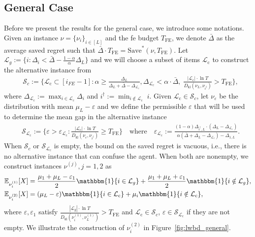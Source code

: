 \documentclass[twoside,11pt]{article}
\newcommand{\kl}{D_{\mathrm{kl}}}
\newcommand{\calL}{\mathcal{L}}
\newcommand{\calS}{\mathcal{S}}
\newcommand{\rmc}{\mathrm{c}}
\newcommand{\bbE}{\mathbb{E}}
\newcommand{\Tfe}{T_{\mathrm{FE}}}
\newcommand{\Saved}{\mathrm{Save}}
\newcommand{\idagger}{{i^{\dagger}}}
\newcommand{\barDelta}{\bar{\Delta}}
\begin{document}
\subsection{General Case}\label{app:general_result}
Before we present the results for the general case, we introduce some notations. 
Given an instance  $\nu = \{\nu_i\}_{i\in[L]}$ and the \ac{fe} budget $\Tfe$, we denote $\barDelta$ as the average saved regret such that $\barDelta\cdot \Tfe = \Saved^*(\nu,\Tfe) $.
Let $\calL_g := \{i:\Delta_i<\barDelta-\frac{1-\alpha}{\alpha}\Delta_L\}$ and we will choose a subset of items $\calL_{\rmc}$ to construct the alternative instance from
\begin{align}
    &\calS_c:=\Big\{
        \calL_{\rmc}\subset  [i_{FE}-1]: \alpha \geq \frac{\Delta_{L}}{\Delta_{L}+\barDelta-\Delta_{\calL_{\rmc}}},
            \Delta_{\calL_{\rmc}}<\alpha\cdot\barDelta,\;
            \frac{|\calL_{\rmc}|\cdot \ln T}{\kl(\nu_L,\nu_{i^\dagger})} > \Tfe
    \Big\},
\end{align}
where $\Delta_{\calL_{\rmc}}:=\max_{i\in\calL_{\rmc}}\Delta_{i}$ and 
    $\idagger:=\min_{i\notin\calL_{\rmc}}\; i$.
Given $\calL_{\rmc}\in\calS_c$, let $\nu_\varepsilon$ be the distribution with mean $\mu_L-\varepsilon$ and we define the permissible $\varepsilon$ that will be used to determine the mean gap in the alternative instance
\begin{align}
    &\calS_{\calL_{\rmc}}
    :=
    \Big\{\varepsilon>\varepsilon_{\calL_{\rmc}}: \frac{|\calL_{\rmc}|\cdot\ln T}{\kl(\nu_\varepsilon,\nu_{i^\dagger})} \geq \Tfe\Big\}
    \quad \mbox{where}\quad \varepsilon_{\calL_{\rmc}}:=\frac{(1-\alpha)\Delta_{\idagger,L}\cdot(\Delta_{L}-\Delta_{\calL_{\rmc}})}{\alpha(\barDelta+\Delta_{L}-\Delta_{\calL_{\rmc}})-\Delta_{1,L}}.
\end{align}
When $\calS_c$ or $\calS_{\calL_{\rmc}}$ is empty, the bound on the saved regret is vacuous, i.e., there is no alternative instance that can confuse the agent.
When both are nonempty, we construct instances $\nu^{(j)},j=1,2$ as
\begin{align}
    &\bbE_{\nu_i^{(1)}}[X]=
        \frac{\mu_1+\mu_L-\varepsilon_1}{2}\mathbbm{1}\{i\in\calL_g\}+\frac{\mu_1+\mu_L+\varepsilon_1}{2}\mathbbm{1}\{i\notin\calL_g\},
        \\*
    &\bbE_{\nu_i^{(2)}}[X]=(\mu_L-\varepsilon)\mathbbm{1}\{i\in\calL_{\rmc}\}
            +\mu_i\mathbbm{1}\{i\notin\calL_{\rmc}\},
\end{align}
where $\varepsilon,\varepsilon_1$ satisfy $\frac{|\calL_g|\cdot \ln T}{\kl(\nu_i^{(1)},\nu_{L}^{(1)})} >\Tfe$ and $\calL_{\rmc}\in\calS_c$, $\varepsilon\in\calS_{\calL_{\rmc}}$ if they are not empty.
We illustrate the construction of $\nu_i^{(2)}$ in Figure~\ref{fig:lwbd_general}.
\end{document}
